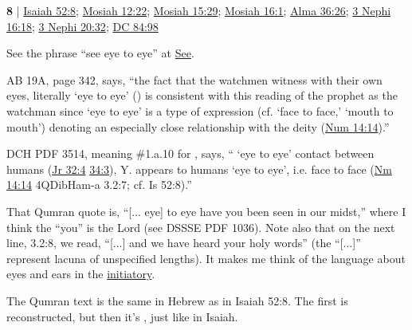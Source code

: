 	\begin{compactdesc}
	
		\item[eye to eye] \textbf{8} | \hyperref[ISAIAH-52-8]{Isaiah 52:8}; \hyperref[MOSIAH-12-22]{Mosiah 12:22}; \hyperref[MOSIAH-15-29]{Mosiah 15:29}; \hyperref[MOSIAH-16-1]{Mosiah 16:1}; \hyperref[ALMA-36-26]{Alma 36:26}; \hyperref[3NEPHI-16-18]{3 Nephi 16:18}; \hyperref[3NEPHI-20-32]{3 Nephi 20:32}; \hyperref[DC84-98]{DC 84:98}
			\begin{compactdesc}
				\item[Bible anchor verses] 
					\begin{compactdesc}
						\item[{\hyperref[ISAIAH-52-8]{Isaiah 52:8}}] 
					\end{compactdesc}
				\item[Commentary] See the phrase ``see eye to eye'' at \hyperref[SEE-PHRASES]{See}.
				\item AB 19A, page 342, says, ``the fact that the watchmen witness with their own eyes, literally `eye to eye' () is consistent with this reading of the prophet as the watchman since `eye to eye' is a type of expression (cf. `face to face,' `mouth to mouth') denoting an especially close relationship with the deity (\hyperref[NUMBERS-14-14]{Num 14:14}).''
				\item DCH PDF 3514, meaning \#1.a.10 for , says, `` `eye to eye' contact between humans (\hyperref[JEREMIAH-32-4]{Jr 32:4} \hyperref[JEREMIAH-34-3]{34:3}), Y. appears to humans `eye to eye', i.e. face to face (\hyperref[NUMBERS-14-14]{Nm 14:14} 4QDibHam-a 3.2:7; cf. Is 52:8).''
				\item That Qumran quote is, ``[... eye] to eye have you been seen in our midst,'' where I think the ``you'' is the Lord (see DSSSE PDF 1036). Note also that on the next line, 3.2:8, we read, ``[...] and we have heard your holy words'' (the ``[...]'' represent lacuna of unspecified lengths). It makes me think of the language about eyes and ears in the \hyperref[TEMPLE-ENDOWMENT-INIT-PRE-2005-WASH]{initiatory}.
				\item The Qumran text is the same in Hebrew as in Isaiah 52:8. The first  is reconstructed, but then it's , just like in Isaiah.
			\end{compactdesc}
			
			
	\end{compactdesc}
	
